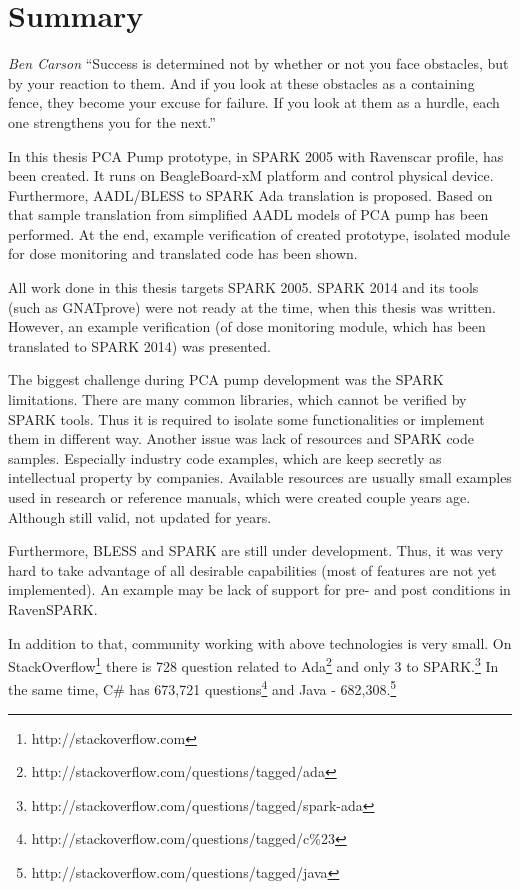 
\cleardoublepage

\chapter{Summary}
\label{summary}

\begin{chapquote}{\textit{Ben Carson}}
``Success is determined not by whether or not you face obstacles, but by your reaction to them. And if you look at these obstacles as a containing fence, they become your excuse for failure. If you look at them as a hurdle, each one strengthens you for the next.''
\end{chapquote}

In this thesis PCA Pump prototype, in SPARK 2005 with Ravenscar profile, has been created. It runs on BeagleBoard-xM platform and control physical device. Furthermore, AADL/BLESS to SPARK Ada translation is proposed. Based on that sample translation from simplified AADL models of PCA pump has been performed. At the end, example verification of created prototype, isolated module for dose monitoring and translated code has been shown. 

All work done in this thesis targets SPARK 2005. SPARK 2014 and its tools (such as GNATprove) were not ready at the time, when this thesis was written. However, an example verification (of dose monitoring module, which has been translated to SPARK 2014) was presented.

The biggest challenge during PCA pump development was the SPARK limitations. There are many common libraries, which cannot be verified by SPARK tools. Thus it is required to isolate some functionalities or implement them in different way. Another issue was lack of resources and SPARK code samples. Especially industry code examples, which are keep secretly as intellectual property by companies. Available resources are usually small examples used in research or reference manuals, which were created couple years age. Although still valid, not updated for years.

Furthermore, BLESS and SPARK are still under development. Thus, it was very hard to take advantage of all desirable capabilities (most of features are not yet implemented). An example may be lack of support for pre- and post conditions in RavenSPARK.

In addition to that, community working with above technologies is very small. On StackOverflow\footnote{http://stackoverflow.com} there is 728 question related to Ada\footnote{http://stackoverflow.com/questions/tagged/ada} and only 3 to SPARK.\footnote{http://stackoverflow.com/questions/tagged/spark-ada} In the same time, C\# has 673,721 questions\footnote{http://stackoverflow.com/questions/tagged/c\%23} and Java - 682,308.\footnote{http://stackoverflow.com/questions/tagged/java}

